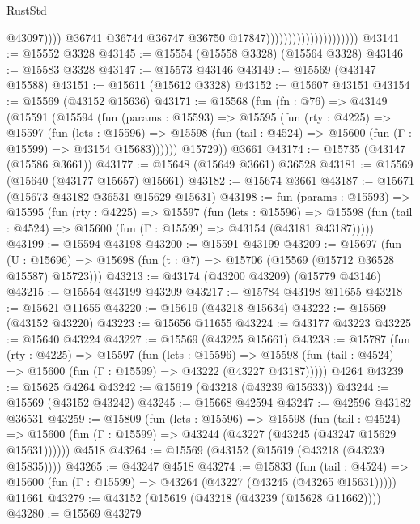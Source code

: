 \begin{lexlean}{RustStd}
\begin{coremodule}
                                                      @43097))))
                                              @36741
                                              @36744
                                              @36747
                                              @36750
                                              @17847)))))))))))))))))))))
@43141 := @15552 @3328
@43145 := @15554 (@15558 @3328) (@15564 @3328)
@43146 := @15583 @3328
@43147 := @15573 @43146
@43149 := @15569 (@43147 @15588)
@43151 := @15611 (@15612 @3328)
@43152 := @15607 @43151
@43154 := @15569 (@43152 @15636)
@43171 := @15568
    (fun (fn : @76) =>
    @43149
      (@15591
        (@15594
          (fun (params : @15593) =>
          @15595
            (fun (rty : @4225) =>
            @15597
              (fun (lets : @15596) =>
              @15598 (fun (tail : @4524) => @15600 (fun (Γ : @15599) => @43154 @15683))))))
        @15729))
    @3661
@43174 := @15735 (@43147 (@15586 @3661))
@43177 := @15648 (@15649 @3661) @36528
@43181 := @15569 (@15640 (@43177 @15657) @15661)
@43182 := @15674 @3661
@43187 := @15671 (@15673 @43182 @36531 @15629 @15631)
@43198 := fun (params : @15593) =>
  @15595
    (fun (rty : @4225) =>
    @15597
      (fun (lets : @15596) =>
      @15598 (fun (tail : @4524) => @15600 (fun (Γ : @15599) => @43154 (@43181 @43187)))))
@43199 := @15594 @43198
@43200 := @15591 @43199
@43209 := @15697
    (fun (U : @15696) => @15698 (fun (t : @7) => @15706 (@15569 (@15712 @36528 @15587) @15723)))
@43213 := @43174 (@43200 @43209) (@15779 @43146)
@43215 := @15554 @43199 @43209
@43217 := @15784 @43198 @11655
@43218 := @15621 @11655
@43220 := @15619 (@43218 @15634)
@43222 := @15569 (@43152 @43220)
@43223 := @15656 @11655
@43224 := @43177 @43223
@43225 := @15640 @43224
@43227 := @15569 (@43225 @15661)
@43238 := @15787
    (fun (rty : @4225) =>
    @15597
      (fun (lets : @15596) =>
      @15598 (fun (tail : @4524) => @15600 (fun (Γ : @15599) => @43222 (@43227 @43187)))))
    @4264
@43239 := @15625 @4264
@43242 := @15619 (@43218 (@43239 @15633))
@43244 := @15569 (@43152 @43242)
@43245 := @15668 @42594
@43247 := @42596 @43182 @36531
@43259 := @15809
    (fun (lets : @15596) =>
    @15598
      (fun (tail : @4524) =>
      @15600 (fun (Γ : @15599) => @43244 (@43227 (@43245 (@43247 @15629 @15631))))))
    @4518
@43264 := @15569 (@43152 (@15619 (@43218 (@43239 @15835))))
@43265 := @43247 @4518
@43274 := @15833
    (fun (tail : @4524) => @15600 (fun (Γ : @15599) => @43264 (@43227 (@43245 (@43265 @15631)))))
    @11661
@43279 := @43152 (@15619 (@43218 (@43239 (@15628 @11662))))
@43280 := @15569 @43279

\end{coremodule}
\end{lexlean}
